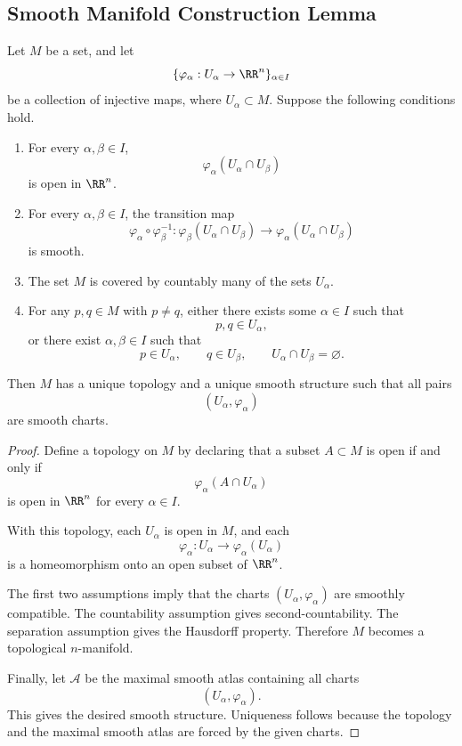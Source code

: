 \subsection{Smooth Manifold Construction Lemma}

\begin{theorem}
Let $M$ be a set, and let
\[
  \{\varphi_\alpha:U_\alpha\to \RR^n\}_{\alpha\in I}
\]
be a collection of injective maps, where $U_\alpha\subset M$. Suppose the following conditions hold.

\begin{enumerate}
  \item For every $\alpha,\beta\in I$,
  \[
    \varphi_\alpha(U_\alpha\cap U_\beta)
  \]
  is open in $\RR^n$.

  \item For every $\alpha,\beta\in I$, the transition map
  \[
    \varphi_\alpha\circ\varphi_\beta^{-1}
    :
    \varphi_\beta(U_\alpha\cap U_\beta)
    \to
    \varphi_\alpha(U_\alpha\cap U_\beta)
  \]
  is smooth.

  \item The set $M$ is covered by countably many of the sets $U_\alpha$.

  \item For any $p,q\in M$ with $p\neq q$, either there exists some $\alpha\in I$ such that
  \[
    p,q\in U_\alpha,
  \]
  or there exist $\alpha,\beta\in I$ such that
  \[
    p\in U_\alpha,\qquad q\in U_\beta,\qquad U_\alpha\cap U_\beta=\varnothing.
  \]
\end{enumerate}

Then $M$ has a unique topology and a unique smooth structure such that all pairs
\[
  (U_\alpha,\varphi_\alpha)
\]
are smooth charts.
\end{theorem}

\begin{proof}
Define a topology on $M$ by declaring that a subset $A\subset M$ is open if and only if
\[
  \varphi_\alpha(A\cap U_\alpha)
\]
is open in $\RR^n$ for every $\alpha\in I$.

With this topology, each $U_\alpha$ is open in $M$, and each
\[
  \varphi_\alpha:U_\alpha\to \varphi_\alpha(U_\alpha)
\]
is a homeomorphism onto an open subset of $\RR^n$.

The first two assumptions imply that the charts $(U_\alpha,\varphi_\alpha)$ are smoothly compatible. The countability assumption gives second-countability. The separation assumption gives the Hausdorff property. Therefore $M$ becomes a topological $n$-manifold.

Finally, let $\mathcal A$ be the maximal smooth atlas containing all charts
\[
  (U_\alpha,\varphi_\alpha).
\]
This gives the desired smooth structure. Uniqueness follows because the topology and the maximal smooth atlas are forced by the given charts.
\end{proof}

